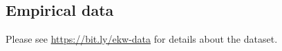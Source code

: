 \subsection{Empirical data}\label{Appendix data}
Please see \url{https://bit.ly/ekw-data} for details about the dataset.
